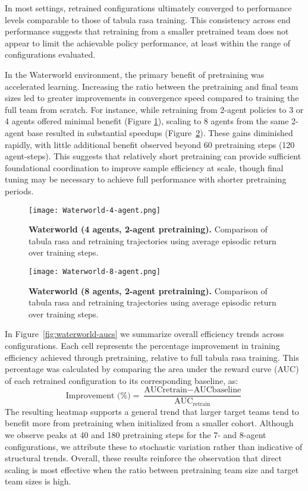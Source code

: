 \documentclass{article}
\begin{document}
In most settings, retrained configurations ultimately converged to 
performance levels comparable to those of tabula rasa training.
This consistency across end performance suggests that retraining from a smaller 
pretrained team does not appear to limit the achievable policy performance, 
at least within the range of configurations evaluated.

In the Waterworld environment, the primary benefit of pretraining was accelerated learning. 
Increasing the ratio between the pretraining and final team sizes led to greater improvements 
in convergence speed compared to training the full team from scratch. For instance, 
while retraining from 2-agent policies to 3 or 4 agents offered minimal benefit 
(Figure \ref{fig:waterworld-4}), scaling to 8 agents from the same 2-agent base resulted in 
substantial speedups (Figure~\ref{fig:waterworld-8}). These gains diminished rapidly, 
with little additional benefit observed beyond 60 pretraining steps (120 agent-steps).
This suggests that relatively short pretraining can provide sufficient foundational 
coordination to improve sample efficiency at scale, though final tuning may 
be necessary to achieve full performance with shorter pretraining periods.

\begin{figure}[!h]
    \centering
    \texttt{[image: Waterworld-4-agent.png]}
    \caption{\textbf{Waterworld (4 agents, 2-agent pretraining).} Comparison of tabula rasa 
    and retraining trajectories using average episodic return over training steps.}
    \label{fig:waterworld-4}
\end{figure}

\begin{figure}[!h]
    \centering
    \texttt{[image: Waterworld-8-agent.png]}
    \caption{\textbf{Waterworld (8 agents, 2-agent pretraining).} Comparison of tabula rasa 
    and retraining trajectories using average episodic return over training steps.}
    \label{fig:waterworld-8}
\end{figure}

In Figure~\ref{fig:waterworld-aucs} we summarize overall efficiency trends across configurations. 
Each cell represents the percentage improvement in training efficiency 
achieved through pretraining, relative to full tabula rasa training.
This percentage was calculated by comparing the area under the reward curve 
(AUC) of each retrained configuration to its corresponding baseline, as:
\[
    \text{Improvement (\%)} 
    = \frac{\text{AUC}{\text{retrain}} - \text{AUC}{\text{baseline}}}{\text{AUC}_{\text{retrain}}}
\]
The resulting heatmap supports a general trend that larger target teams tend to 
benefit more from pretraining when initialized from a smaller cohort.
Although we observe peaks at 40 and 180 pretraining steps for the 7- and 8-agent configurations, 
we attribute these to stochastic variation rather than indicative of structural trends.
Overall, these results reinforce the observation that direct scaling is most effective 
when the ratio between pretraining team size and target team sizes is high.
\end{document}
